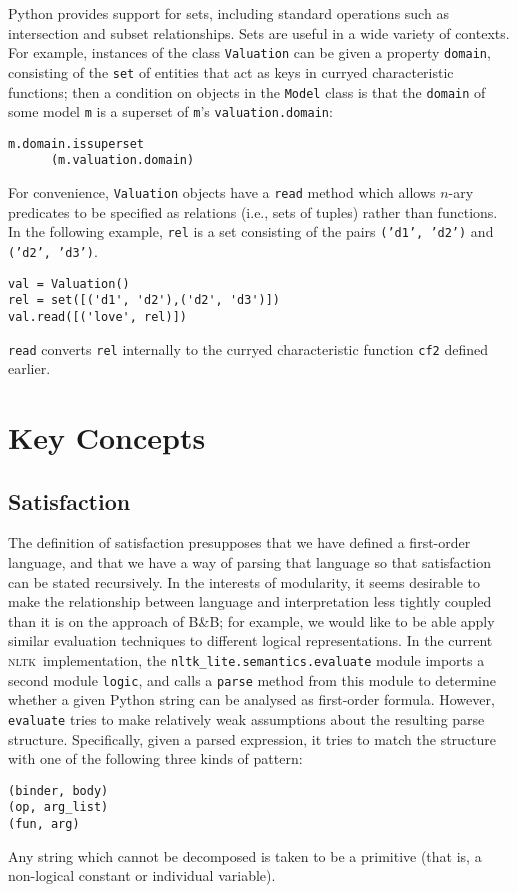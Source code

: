 \documentclass[11pt]{article}
\newcommand{\code}[1]{\texttt{#1}}
\newcommand{\bnb}{B\&B}
\newcommand{\nltk}{\textsc{nltk}}
\begin{document}
Python provides support for sets, including standard operations such as
intersection and subset relationships. Sets are useful in a wide
variety of contexts. For example, instances of the class
\code{Valuation} can be given a property \code{domain}, consisting
of the \code{set} of entities that act as keys in curryed
characteristic functions; then a condition on objects in the
\code{Model} class is that the \code{domain} of some model
\code{m} is a superset
of \code{m}'s \code{valuation.domain}:
\begin{Verbatim}
m.domain.issuperset
      (m.valuation.domain)
\end{Verbatim}

For convenience, \code{Valuation} objects
have a \code{read} method which allows $n$-ary predicates to be
specified as relations (i.e., sets of tuples) rather than functions.
In the following example, \verb!rel! is a set consisting of the
pairs \code{('d1', 'd2')} and \code{('d2', 'd3')}.
\begin{Verbatim}
val = Valuation() 
rel = set([('d1', 'd2'),('d2', 'd3')])
val.read([('love', rel)])
\end{Verbatim}
\code{read} converts \code{rel} internally to the curryed
characteristic function \code{cf2} defined earlier.

\section{Key Concepts}

\subsection{Satisfaction}


The definition of satisfaction presupposes that we have defined a
first-order language, and that we have a way of parsing that language
so that satisfaction can be stated recursively. In the interests of
modularity, it seems desirable to make the relationship between
language and interpretation less tightly coupled than it is on the
approach of \bnb; for example, we would like to be able apply similar
evaluation techniques to different logical representations. 
In the current \nltk\ implementation, the
\verb!nltk_lite.semantics.evaluate! module imports a second module
\code{logic}, and calls a \code{parse} method from this module to
determine whether a given Python string can be analysed as first-order
formula. However, \code{evaluate} tries to make relatively weak
assumptions about the resulting parse structure. Specifically, given a
parsed expression, it tries to match the structure with one of the
following three kinds of pattern:
\begin{Verbatim}
(binder, body)
(op, arg_list)
(fun, arg)
\end{Verbatim}
Any string which cannot be decomposed is taken to be a
primitive (that is, a non-logical constant or individual variable).
\end{document}
